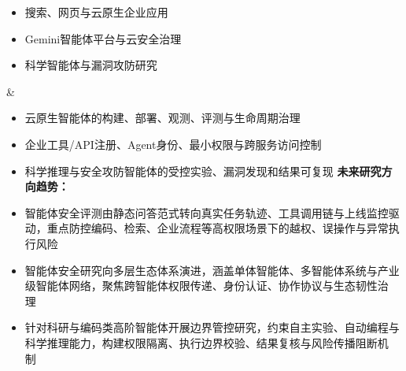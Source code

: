 \begin{longtblr}[
  caption = {北美主流AI智能体安全产品与落地方向},
  label   = {tab:north-america-agent-security-products},
]
\begin{itemize}[leftmargin=*,topsep=0pt,partopsep=0pt,itemsep=1pt,parsep=0pt]
    \item 搜索、网页与云原生企业应用
    \item Gemini智能体平台与云安全治理
    \item 科学智能体与漏洞攻防研究
  \end{itemize}
& \begin{itemize}[leftmargin=*,topsep=0pt,partopsep=0pt,itemsep=1pt,parsep=0pt]
    \item 云原生智能体的构建、部署、观测、评测与生命周期治理
    \item 企业工具/API注册、Agent身份、最小权限与跨服务访问控制
    \item 科学推理与安全攻防智能体的受控实验、漏洞发现和结果可复现
    \textbf{未来研究方向趋势：}
    \item 智能体安全评测由静态问答范式转向真实任务轨迹、工具调用链与上线监控驱动，重点防控编码、检索、企业流程等高权限场景下的越权、误操作与异常执行风险~\cite {googleaicontrolroadmap2026,deepmindagentsecurityblog2026,debenedetti2024agentdojo}
    \item 智能体安全研究向多层生态体系演进，涵盖单体智能体、多智能体系统与产业级智能体网络，聚焦跨智能体权限传递、身份认证、协作协议与生态韧性治理~\cite {googlethreelayersagentsecurity2026,habler2025securea2a}
    \item 针对科研与编码类高阶智能体开展边界管控研究，约束自主实验、自动编程与科学推理能力，构建权限隔离、执行边界校验、结果复核与风险传播阻断机制~\cite {deepmindalphaevolve2025,gottweis2025coscientist,googleaicontrolroadmap2026}

\end{itemize}
\end{longtblr}
